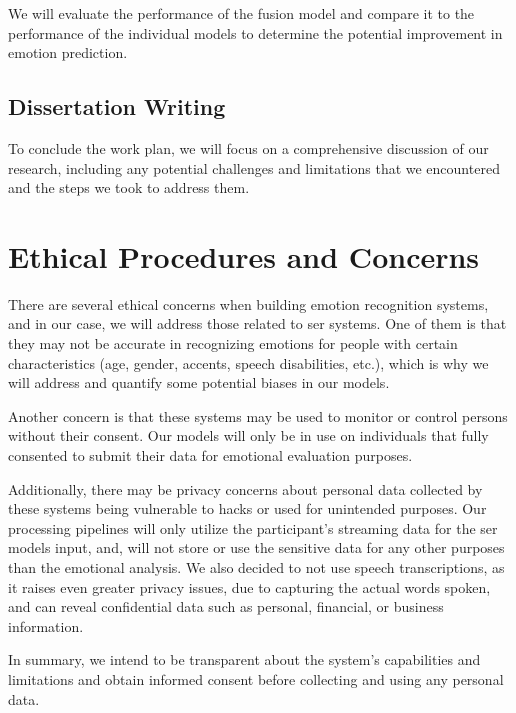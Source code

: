 We will evaluate the performance of the fusion model and compare it to the performance of the individual models to determine the potential improvement in emotion prediction.

\subsection{Dissertation Writing}

To conclude the work plan, we will focus on a comprehensive discussion of our research, including any potential challenges and limitations that we encountered and the steps we took to address them.

\section{Ethical Procedures and Concerns}

There are several ethical concerns when building emotion recognition systems, and in our case, we will address those related to \ac{ser} systems. One of them is that they may not be accurate in recognizing emotions for people with certain characteristics (age, gender, accents, speech disabilities, etc.), which is why we will address and quantify some potential biases in our models.

Another concern is that these systems may be used to monitor or control persons without their consent. Our models will only be in use on individuals that fully consented to submit their data for emotional evaluation purposes.

Additionally, there may be privacy concerns about personal data collected by these systems being vulnerable to hacks or used for unintended purposes. Our processing pipelines will only utilize the participant's streaming data for the \ac{ser} models input, and, will not store or use the sensitive data for any other purposes than the emotional analysis. We also decided to not use speech transcriptions, as it raises even greater privacy issues, due to capturing the actual words spoken, and can reveal confidential data such as personal, financial, or business information.

In summary, we intend to be transparent about the system's capabilities and limitations and obtain informed consent before collecting and using any personal data.

